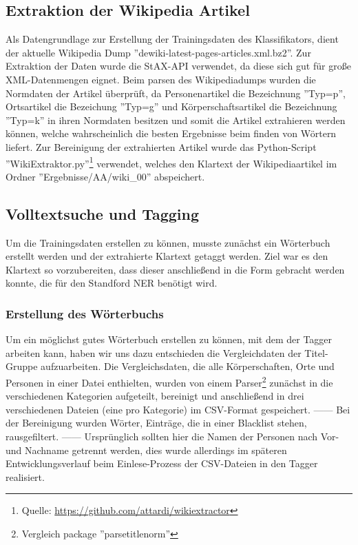 \documentclass[a4paper]{article}
\begin{document}
	\subsection{Extraktion der Wikipedia Artikel}
		Als Datengrundlage zur Erstellung der Trainingsdaten des Klassifikators, dient der aktuelle Wikipedia Dump ''dewiki-latest-pages-articles.xml.bz2''. 
		Zur Extraktion der Daten wurde die StAX-API verwendet, da diese sich gut für große XML-Datenmengen eignet. 
		Beim parsen des Wikipediadumps wurden die Normdaten der Artikel überprüft, da Personenartikel die Bezeichnung ''Typ=p'', Ortsartikel die Bezeichung ''Typ=g'' und Körperschaftsartikel die Bezeichnung ''Typ=k'' in ihren Normdaten besitzen und somit die Artikel extrahieren werden können, welche wahrscheinlich die besten Ergebnisse beim finden von Wörtern liefert. 
		Zur Bereinigung der extrahierten Artikel wurde das Python-Script ''WikiExtraktor.py''\footnote{Quelle: \url{https://github.com/attardi/wikiextractor}} verwendet, welches den Klartext der Wikipediaartikel im Ordner ''Ergebnisse/AA/wiki\_00'' abspeichert.
		
	\subsection{Volltextsuche und Tagging}
		Um die Trainingsdaten erstellen zu können, musste zunächst ein Wörterbuch erstellt werden und der extrahierte Klartext getaggt werden.
		Ziel war es den Klartext so vorzubereiten, dass dieser anschließend in die Form gebracht werden konnte, die für den Standford NER benötigt wird.

		\subsubsection{Erstellung des Wörterbuchs}
			Um ein möglichst gutes Wörterbuch erstellen zu können, mit dem der Tagger arbeiten kann, haben wir uns dazu entschieden die Vergleichdaten der Titel-Gruppe aufzuarbeiten.
			Die Vergleichsdaten, die alle Körperschaften, Orte und Personen in einer Datei enthielten, wurden von einem Parser\footnote{Vergleich package ''parsetitlenorm''} zunächst in die verschiedenen Kategorien aufgeteilt, bereinigt und anschließend in drei verschiedenen Dateien (eine pro Kategorie) im CSV-Format gespeichert. 
	 ------ Bei der Bereinigung wurden Wörter, Einträge, die in einer Blacklist stehen, rausgefiltert. ------
			Ursprünglich sollten hier die Namen der Personen nach Vor- und Nachname getrennt werden, dies wurde allerdings im späteren Entwicklungsverlauf beim Einlese-Prozess der CSV-Dateien in den Tagger realisiert.
\end{document}
